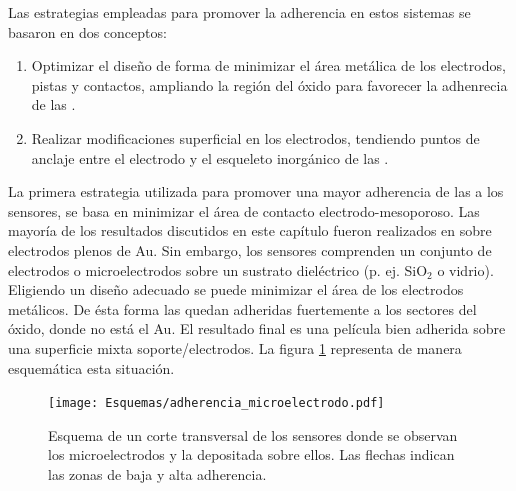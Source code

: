              Las estrategias empleadas para promover la adherencia en estos sistemas se basaron en dos conceptos:
				\begin{enumerate}

					\item Optimizar el diseño de forma de minimizar el área metálica de los electrodos, pistas y contactos, ampliando la región del óxido para favorecer la adhenrecia de las \pdm.

					\item Realizar modificaciones superficial en los electrodos, tendiendo puntos de anclaje entre el electrodo y el esqueleto inorgánico de las \pdm.

					\end{enumerate}
			
			 La primera estrategia utilizada para promover una mayor adherencia de las \pdm\space a los sensores, se basa en minimizar el área de contacto electrodo-mesoporoso. Las mayoría de los resultados discutidos en este capítulo fueron realizados en \pdm\space sobre electrodos plenos de Au. Sin embargo, los sensores comprenden un conjunto de electrodos o microelectrodos sobre un sustrato dieléctrico (p. ej. SiO$_2$ o vidrio). Eligiendo un diseño adecuado se puede minimizar el área de los electrodos metálicos. De ésta forma las \pdm\space quedan adheridas fuertemente a los sectores del óxido, donde no está el Au. El resultado final es una película bien adherida sobre una superficie mixta soporte/electrodos.  La figura \ref{fig:adherencia_microelectrodo} representa de manera esquemática esta situación.
			
				\begin{figure}[!ht]
					\begin{center}
					\texttt{[image: Esquemas/adherencia\_microelectrodo.pdf]}
					\caption[Adherencia a los microelectrodos.]{Esquema de un corte transversal de los sensores donde se observan los microelectrodos y la \pdm\space depositada sobre ellos. Las flechas indican las zonas de baja y alta adherencia.}
					\label{fig:adherencia_microelectrodo}
					\end{center}
					\end{figure}
					
